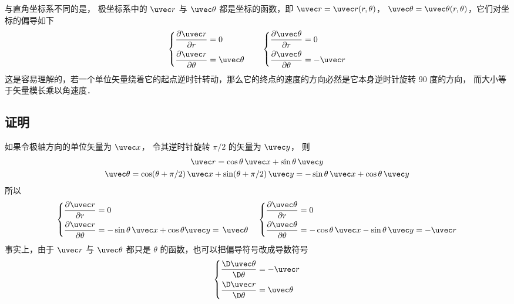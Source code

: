 
与直角坐标系不同的是， 极坐标系中的 $\uvec r$ 与 $\uvec \theta $ 都是坐标的函数，即 $\uvec r = \uvec r (r,\theta)$， $\uvec \theta  = \uvec \theta (r,\theta)$，它们对坐标的偏导如下
\begin{equation}
\left\{ \begin{aligned}
\frac{{\partial \uvec r}}{{\partial r}} &= 0\\
\frac{{\partial \uvec r}}{{\partial \theta }} &= \uvec \theta 
\end{aligned} \right.
\qquad
\left\{ \begin{aligned}
\frac{{\partial \uvec \theta }}{{\partial r}} &= 0\\
\frac{{\partial \uvec \theta }}{{\partial \theta }} &=  - \uvec r
\end{aligned} \right.
\end{equation}
这是容易理解的，若一个单位矢量绕着它的起点逆时针转动，那么它的终点的速度的方向必然是它本身逆时针旋转 90 度的方向， 而大小等于矢量模长乘以角速度．
\subsection{证明}
如果令极轴方向的单位矢量为 $\uvec x$， 令其逆时针旋转 $\pi/2$ 的矢量为 $\uvec y$， 则
\begin{gather}
\uvec r = \cos \theta \,\uvec x + \sin \theta \,\uvec y\\
\uvec \theta  = \cos (\theta +\pi/2)\,\uvec x + \sin (\theta +\pi/2)\,\uvec y
=  - \sin \theta \,\uvec x + \cos \theta \,\uvec y
\end{gather} 
所以
\begin{equation}
\left\{ \begin{aligned}
\frac{{\partial \uvec r}}{{\partial r}} &= 0\\
\frac{{\partial \uvec r}}{{\partial \theta }} &=  - \sin \theta \,\uvec x + \cos \theta \uvec y = \,\uvec \theta 
\end{aligned} \right.
\quad
\left\{ \begin{aligned}
\frac{{\partial \uvec \theta }}{{\partial r}} &= 0\\
\frac{{\partial \uvec \theta }}{{\partial \theta }} &=  - \cos \theta \,\uvec x - \sin \theta \,\uvec y =  - \uvec r
\end{aligned} \right.
\end{equation}  
事实上，由于 $\uvec r$ 与 $\uvec \theta $ 都只是 $\theta$ 的函数，也可以把偏导符号改成导数符号
 \begin{equation}
\left\{ \begin{aligned}
\frac{{\D \uvec \theta }}{{\D \theta }} &=  - \uvec r\\
\frac{{\D \uvec r}}{{\D \theta }} &= \uvec \theta 
\end{aligned} \right.
\end{equation}
 
 
 
 
 
 
 
 
 
 
 
 
 
 
 
 
 
 
 
 
 
 
 
 
 
 